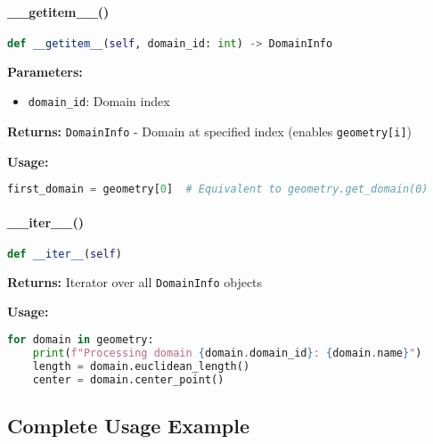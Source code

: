 \paragraph{\_\_getitem\_\_()}
\begin{lstlisting}[language=Python, caption=Indexing Support]
def __getitem__(self, domain_id: int) -> DomainInfo
\end{lstlisting}

\textbf{Parameters:}
\begin{itemize}
    \item \texttt{domain\_id}: Domain index
\end{itemize}

\textbf{Returns:} \texttt{DomainInfo} - Domain at specified index (enables \texttt{geometry[i]})

\textbf{Usage:}
\begin{lstlisting}[language=Python]
first_domain = geometry[0]  # Equivalent to geometry.get_domain(0)
\end{lstlisting}

\paragraph{\_\_iter\_\_()}
\begin{lstlisting}[language=Python, caption=Iteration Support]
def __iter__(self)
\end{lstlisting}

\textbf{Returns:} Iterator over all \texttt{DomainInfo} objects

\textbf{Usage:}
\begin{lstlisting}[language=Python]
for domain in geometry:
    print(f"Processing domain {domain.domain_id}: {domain.name}")
    length = domain.euclidean_length()
    center = domain.center_point()
\end{lstlisting}

\subsection{Complete Usage Example}
\label{subsec:complete_example}

